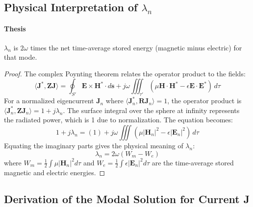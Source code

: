 \documentclass[11pt, a4paper]{report}
\begin{document}
\subsection{Physical Interpretation of $\lambda_n$} \label{ssec:proof_phys}
\paragraph{Thesis} $\lambda_n$ is $2\omega$ times the net time-average stored energy (magnetic minus electric) for that mode.
\begin{proof}
The complex Poynting theorem relates the operator product to the fields:
\begin{equation}
\langle \mathbf{J}^*, \mathbf{Z}\mathbf{J} \rangle = \oint_{S'} \mathbf{E} \times \mathbf{H}^* \cdot d\mathbf{s} + j\omega \iiint_{\tau'} (\mu \mathbf{H}\cdot\mathbf{H}^* - \epsilon \mathbf{E}\cdot\mathbf{E}^*) \,d\tau
\end{equation}
For a normalized eigencurrent $\mathbf{J}_n$ where $\langle \mathbf{J}_n^*, \mathbf{R}\mathbf{J}_n \rangle = 1$, the operator product is $\langle \mathbf{J}_n^*, \mathbf{Z}\mathbf{J}_n \rangle = 1+j\lambda_n$. The surface integral over the sphere at infinity represents the radiated power, which is 1 due to normalization. The equation becomes:
\begin{equation}
1 + j\lambda_n = (1) + j\omega \iiint (\mu |\mathbf{H}_n|^2 - \epsilon |\mathbf{E}_n|^2) \,d\tau
\end{equation}
Equating the imaginary parts gives the physical meaning of $\lambda_n$:
\begin{equation}
\lambda_n = 2\omega \left( W_m - W_e \right)
\end{equation}
where $W_m = \frac{1}{2}\int \mu|\mathbf{H}_n|^2 d\tau$ and $W_e = \frac{1}{2}\int \epsilon|\mathbf{E}_n|^2 d\tau$ are the time-average stored magnetic and electric energies.
\end{proof}

\subsection{Derivation of the Modal Solution for Current J} \label{ssec:proof_modal}
\end{document}
